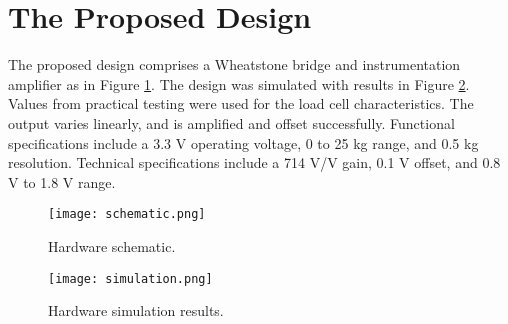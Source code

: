 \section{The Proposed Design}

The proposed design comprises a Wheatstone bridge and instrumentation amplifier as in Figure \ref{fig:schematic}. The design was simulated with results in Figure \ref{fig:simulation}. Values from practical testing were used for the load cell characteristics. The output varies linearly, and is amplified and offset successfully. Functional specifications include a 3.3 V operating voltage, 0 to 25 kg range, and 0.5 kg resolution. Technical specifications include a 714 V/V gain, 0.1 V offset, and 0.8 V to 1.8 V range.


\begin{figure}[!ht]
	\centering
	\texttt{[image: schematic.png]}
	\caption{Hardware schematic.}
	\label{fig:schematic}
\end{figure}

\begin{figure}[!ht]
	\centering
	\texttt{[image: simulation.png]}
	\caption{Hardware simulation results.}
	\label{fig:simulation}
\end{figure}



